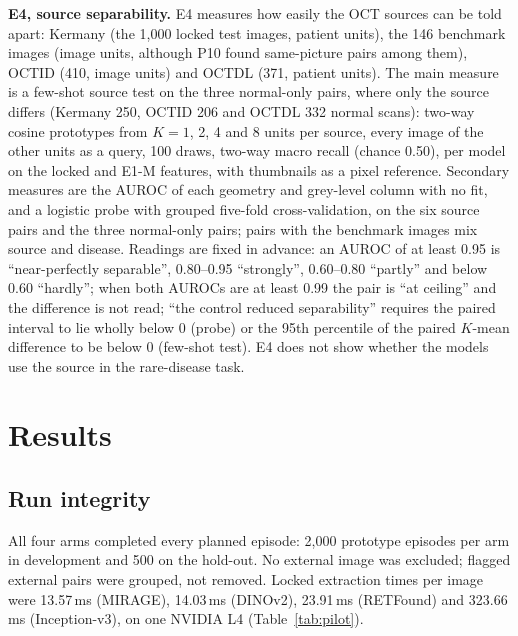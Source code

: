 \documentclass[conference]{IEEEtran}
\begin{document}
\textbf{E4, source separability.} E4 measures how easily the OCT sources can be told apart: Kermany (the 1,000 locked test images, patient units), the 146 benchmark images (image units, although P10 found same-picture pairs among them), OCTID (410, image units) and OCTDL (371, patient units). The main measure is a few-shot source test on the three normal-only pairs, where only the source differs (Kermany 250, OCTID 206 and OCTDL 332 normal scans): two-way cosine prototypes from $K=1$, 2, 4 and 8 units per source, every image of the other units as a query, 100 draws, two-way macro recall (chance 0.50), per model on the locked and E1-M features, with thumbnails as a pixel reference. Secondary measures are the AUROC of each geometry and grey-level column with no fit, and a logistic probe with grouped five-fold cross-validation, on the six source pairs and the three normal-only pairs; pairs with the benchmark images mix source and disease. Readings are fixed in advance: an AUROC of at least 0.95 is ``near-perfectly separable'', 0.80--0.95 ``strongly'', 0.60--0.80 ``partly'' and below 0.60 ``hardly''; when both AUROCs are at least 0.99 the pair is ``at ceiling'' and the difference is not read; ``the control reduced separability'' requires the paired interval to lie wholly below 0 (probe) or the 95th percentile of the paired $K$-mean difference to be below 0 (few-shot test). E4 does not show whether the models use the source in the rare-disease task.

\section{Results}
\label{sec:results}
\subsection{Run integrity}
All four arms completed every planned episode: 2,000 prototype episodes per arm in development and 500 on the hold-out. No external image was excluded; flagged external pairs were grouped, not removed. Locked extraction times per image were 13.57\,ms (MIRAGE), 14.03\,ms (DINOv2), 23.91\,ms (RETFound) and 323.66\,ms (Inception-v3), on one NVIDIA L4 (Table~\ref{tab:pilot}).
\end{document}
